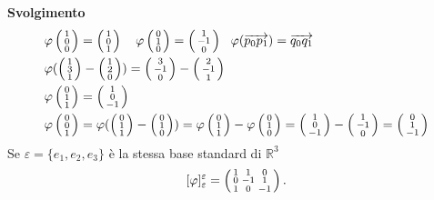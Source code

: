 \documentclass[12px]{article}
\begin{document}
\textbf{Svolgimento}
\begin{align*}
	&\varphi\icol{1\\0\\0} = \icol{1\\0\\1} \ \ \ \varphi\icol{0\\1\\0} = \icol{1\\-1\\0} \ \ \varphi( \overrightarrow{p_0p_1}) = \overrightarrow{q_0q_1}\\
	&	\varphi(\icol{1\\3\\1} - \icol{1\\2\\0}) = \icol{3\\-1\\0} - \icol{2\\-1\\1} \\
	&\varphi\icol{0\\1\\1} = \icol{1\\0\\-1} \\
	&\varphi\icol{0\\0\\1} = \varphi(\icol{0\\1\\1}-\icol{0\\1\\0}) = \varphi\icol{0\\1\\1} - \varphi\icol{0\\1\\0} = \icol{1\\0\\-1}-\icol{1\\-1\\0} = \icol{0\\1\\-1}
\end{align*}
Se $\varepsilon = \{e_1,e_2,e_3\}$ è la stessa base standard di $\mathbb{R}^3$
\[
	[\varphi]^\varepsilon_ \varepsilon = \left(\begin{smallmatrix}1 & 1 & 0\\ 0 &-1&1\\1&0&-1\end{smallmatrix}\right)
.\] 
\end{document}
